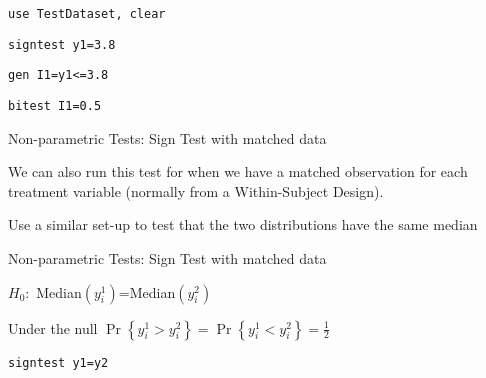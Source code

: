 \documentclass{beamer}
\begin{document}
\begin{frame}
    \begin{card}[STATA]
    \texttt{use TestDataset, clear}
    
    \texttt{signtest y1=3.8}
    
    \texttt{gen I1=y1<=3.8}

    \texttt{bitest I1=0.5}
    \end{card}
\end{frame}

\begin{frame}{Non-parametric Tests: Sign Test with matched data}
\begin{card}
 We can also run this test for when we have a matched observation for each treatment variable (normally from a Within-Subject Design).
 
 Use a similar set-up to test that the two distributions have the same median\end{card}
\end{frame}

\begin{frame}{Non-parametric Tests: Sign Test with matched data}
 \begin{card}
 $H_0:$ Median$(y^1_i)$=Median$(y^2_i)$
 
 Under the null $\Pr\left\{y^1_{i}>y^2_{i}\right\}=\Pr\left\{y^1_{i}<y^2_{i}\right\}=\frac{1}{2}$
 \end{card}
\end{frame}

\begin{frame}
    \begin{card}[STATA]
        \texttt{signtest y1=y2}
    \end{card}
\end{frame}
\end{document}
